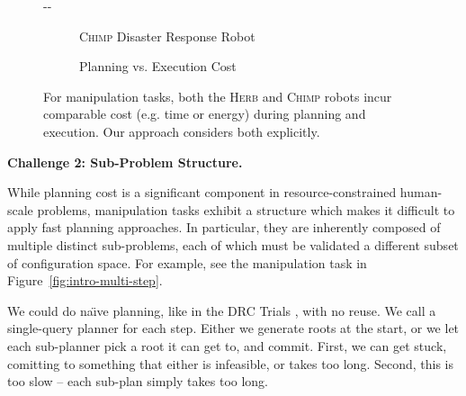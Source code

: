 \documentclass{report}
\newlength{\offsetpage}
\newenvironment{widepage}
   {\begin{adjustwidth}{-\offsetpage}{-\offsetpage}%
    \addtolength{\textwidth}{2\offsetpage}}%
{\end{adjustwidth}}
\begin{document}
{\begin{figure}
\begin{widepage}
\begin{center}
\begin{subfigure}[b]{2.0in}
\begin{center}
      \end{center}
      \caption{\textsc{Chimp} Disaster Response Robot}
   \end{subfigure}%
   \quad%
   \begin{subfigure}[b]{2.0in}
      \begin{center}
      \end{center}
      \caption{Planning vs. Execution Cost}
   \end{subfigure}
   \caption{For manipulation tasks,
      both the \textsc{Herb} \cite{srinivasa2012herb20}
      and \textsc{Chimp} \cite{stentz2014chimp} robots
      incur comparable cost (e.g. time or energy)
      during planning and execution.
      Our approach considers both explicitly.}
   \label{fig:plan-exec-cost}
\end{center}
\end{widepage}
\end{figure}
}

\textbf{Challenge 2: Sub-Problem Structure.}

While planning cost is a significant component
in resource-constrained human-scale problems,
manipulation tasks exhibit a structure
which makes it difficult to apply fast planning approaches.
In particular,
they are inherently composed of multiple distinct sub-problems,
each of which 
must be validated a different subset of configuration space.
For example, see the manipulation task in
Figure~\ref{fig:intro-multi-step}.

We could do na\"{\i}ve planning, like in the
DRC Trials \cite{dellin2014drc},
with no reuse.
We call a single-query planner for each step.
Either we generate roots at the start,
or we let each sub-planner pick a root it can get to, and commit.
First, we can get stuck,
comitting to something that either is infeasible, or takes too long.
Second, this is too slow --
each sub-plan simply takes too long.
\end{document}

